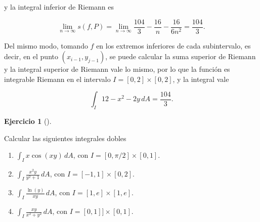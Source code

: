 \documentclass[
  a4paper,
]{scrreport}
\theoremstyle{definition}
\newtheorem{exercise}{Ejercicio}[chapter]
\theoremstyle{remark}
\begin{document}
\begin{tcolorbox}
y la integral inferior de Riemann es

\[
\lim_{n\to\infty} s(f,P)
= \lim_{n\to\infty} \frac{104}{3} -\frac{16}{n} -\frac{16}{6n^2}
= \frac{104}{3}.
\]

Del mismo modo, tomando \(f\) en los extremos inferiores de cada
subintervalo, es decir, en el punto \((x_{i-1},y_{j-1})\), se puede
calcular la suma superior de Riemann y la integral superior de Riemann
vale lo mismo, por lo que la función es integrable Riemann en el
intervalo \(I=[0,2]\times[0,2]\), y la integral vale

\[
\int_I 12-x^2-2y\,dA = \frac{104}{3}.
\]

\end{tcolorbox}

\begin{exercise}[]\protect\hypertarget{exr-integrales-dobles}{}\label{exr-integrales-dobles}

Calcular las siguientes integrales dobles

\begin{enumerate}
\def\labelenumi{\alph{enumi}.}
\item
  \(\int_I x\cos(xy)\,dA\), con \(I=[0,\pi/2]\times[0,1]\).
\item
  \(\int_I \frac{x^2y}{y^2+1}\,dA\), con \(I=[-1,1]\times[0,2]\).
\item
  \(\int_I \frac{\ln(y)}{xy}\,dA\), con \(I=[1,e]\times[1,e]\).
\item
  \(\int_I \frac{xy}{x^2+y^2}\,dA\), con \(I=[0,1]]\times[0,1]\).
\end{enumerate}

\end{exercise}
\end{document}
